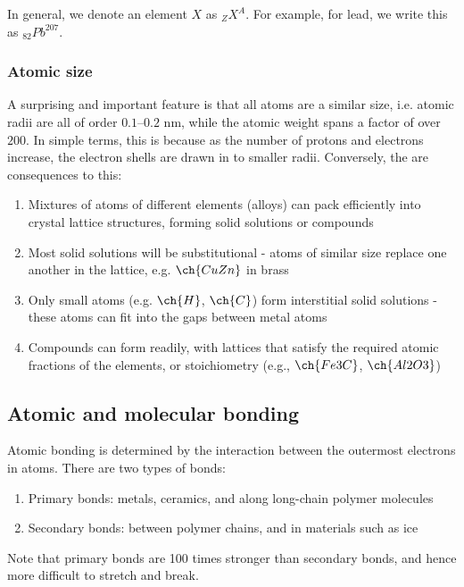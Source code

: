 \documentclass{article}
\begin{document}
In general, we denote an element $X$ as ${}_Z X^A$. For example, for lead, we write this as ${}_{82} Pb^{207}$.

\subsubsection{Atomic size}

A surprising and important feature is that all atoms are a similar size, i.e. atomic radii are all of order
$0.1–0.2$ nm, while the atomic weight spans a factor of over $200$. In simple terms, this is because as the
number of protons and electrons increase, the electron shells are drawn in to smaller radii. Conversely, the are consequences to this:

\begin{enumerate}
    \item Mixtures of atoms of different elements (alloys) can pack efficiently into crystal lattice structures, forming solid solutions or compounds
    \item Most solid solutions will be substitutional - atoms of similar size replace one another in the lattice, e.g. $\ch{CuZn}$ in brass
    \item Only small atoms (e.g. $\ch{H}$, $\ch{C}$) form interstitial solid solutions - these atoms can fit into the gaps between metal atoms
    \item Compounds can form readily, with lattices that satisfy the required atomic fractions of the elements, or stoichiometry (e.g., $\ch{Fe3C}$, $\ch{Al2O3}$)
\end{enumerate}

\newpage

\subsection{Atomic and molecular bonding}

Atomic bonding is determined by the interaction between the outermost electrons in atoms. There are two types of bonds:

\begin{enumerate}
    \item Primary bonds: metals, ceramics, and along long-chain polymer molecules
    \item Secondary bonds: between polymer chains, and in materials such as ice
\end{enumerate}

Note that primary bonds are 100 times stronger than secondary bonds, and hence more difficult to stretch and break.
\end{document}
